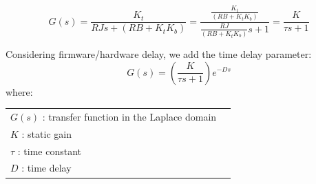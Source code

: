 \documentclass[border={10pt, 10pt, 10pt, 10pt}]{standalone}
\begin{document}
    \begin{minipage}{15cm}
    \[
        G(s) = \frac{K_t}{RJs + (RB + K_t K_b)} = \frac{\frac{K_t}{(RB + K_t K_b)} }{\frac{RJ}{(RB + K_t K_b)}s + 1} = \frac{K}{\tau s + 1}
    \]
    
    Considering firmware/hardware delay, we add the time delay parameter:
    \[
        G(s) = \left( \frac{K}{\tau s + 1} \right) e^{-Ds}
    \]
    where: \\
        \begin{tabular}{l l}    
            $G(s)$ : transfer function in the Laplace domain \\
            $K$ : static gain \\
            $\tau$ : time constant \\
            $D$ : time delay \\ 
        \end{tabular}
    \end{minipage}
\end{document}
